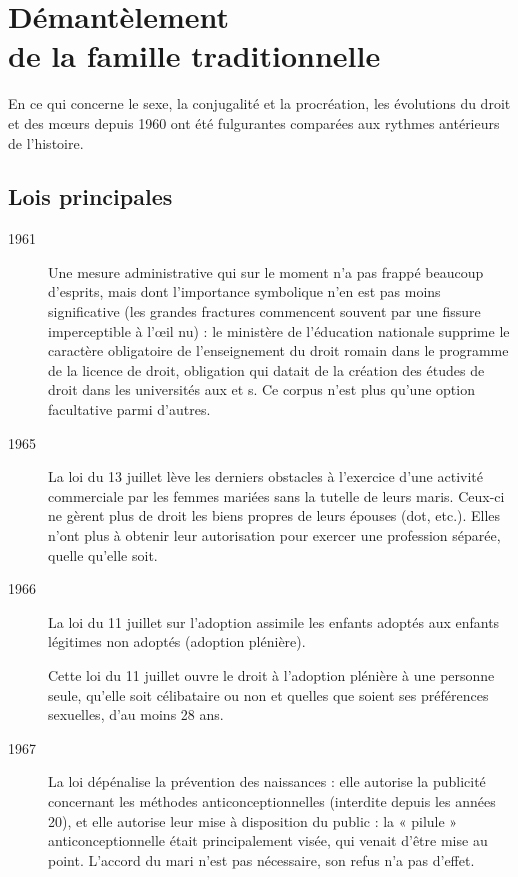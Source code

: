 
\chapter[Démantèlement de la famille traditionnelle]{Démantèlement\\de la famille traditionnelle}


 En ce qui concerne le sexe, la conjugalité et la procréation, les évolutions du droit et des mœurs depuis 1960 ont été fulgurantes comparées aux rythmes antérieurs de l'histoire.


\section{Lois principales}

\begin{description}

\item[1961] Une mesure administrative qui sur le moment n'a pas frappé beaucoup d'esprits, mais dont l'importance symbolique n'en est pas moins significative (les grandes fractures commencent souvent par une fissure imperceptible à l'œil nu) : le ministère de l'éducation nationale supprime le caractère obligatoire de l'enseignement du droit romain dans le programme de la licence de droit, obligation qui datait de la création des études de droit dans les universités aux  et s. Ce corpus n'est plus qu'une option facultative parmi d'autres. 

\item[1965] La loi du 13 juillet lève les derniers obstacles à l'exercice d'une activité commerciale par les femmes mariées sans la tutelle de leurs maris. Ceux-ci ne gèrent plus de droit les biens propres de leurs épouses (dot, etc.). Elles n'ont plus à obtenir leur autorisation pour exercer une profession séparée, quelle qu'elle soit.

\item[1966] La loi du 11 juillet sur l'adoption assimile les enfants adoptés aux enfants légitimes non adoptés (adoption plénière). 

Cette
loi du 11 juillet ouvre le droit à l'adoption plénière à une personne seule, qu'elle soit célibataire ou non et quelles que soient ses préférences sexuelles, d'au moins 28 ans.

\item[1967] La loi  dépénalise la prévention des naissances : elle autorise la publicité concernant les méthodes anticonceptionnelles (interdite depuis les années 20), et elle autorise leur mise à disposition du public :
la « pilule » anticonceptionnelle était principalement visée,
qui venait d'être mise au point. L'accord du mari n'est pas nécessaire, son refus n'a pas d'effet.


\end{description}
